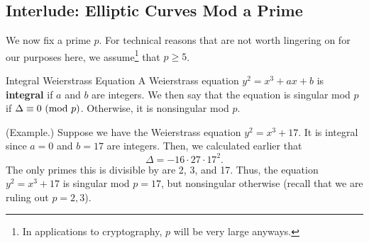 \documentclass[letterpaper]{article}
\begin{document}
\subsection{Interlude: Elliptic Curves Mod a Prime}
We now fix a prime $p$. For technical reasons that are not worth lingering on for our purposes here, we assume\footnote{In applications to cryptography, $p$ will be very large anyways.} that $p \geq 5$. 

\begin{definition}{Integral Weierstrass Equation}{}
    A Weierstrass equation $y^2 = x^3 + ax + b$ is \textbf{integral} if $a$ and $b$ are integers. We then say that the equation is singular mod $p$ if $\Delta \equiv 0 \ (\mathrm{mod}\ p)$. Otherwise, it is nonsingular mod $p$. 
\end{definition}

\begin{mdframed}
    (Example.) Suppose we have the Weierstrass equation $y^2 = x^3 + 17$. It is integral since $a = 0$ and $b = 17$ are integers. Then, we calculated earlier that \[\Delta = -16 \cdot 27 \cdot 17^2.\] The only primes this is divisible by are 2, 3, and 17. Thus, the equation $y^2 = x^3 + 17$ is singular mod $p = 17$, but nonsingular otherwise (recall that we are ruling out $p = 2, 3$).
\end{mdframed}
\end{document}
